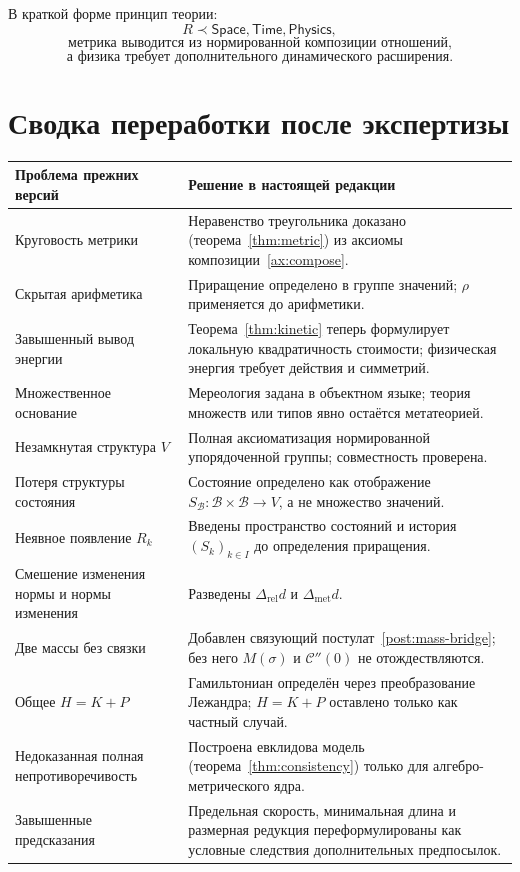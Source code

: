 \documentclass[12pt,a4paper,oneside]{book}
\theoremstyle{definition}
\theoremstyle{plain}
\theoremstyle{remark}
\newcommand{\SubParts}{\mathcal B}
\newcommand{\Rel}{R}
\newcommand{\Values}{V}
\newcommand{\State}{S}
\newcommand{\norm}{\rho}
\newcommand{\Space}{\mathsf{Space}}
\newcommand{\Time}{\mathsf{Time}}
\newcommand{\Physics}{\mathsf{Physics}}
\newcommand{\Stab}{\sigma}
\newcommand{\Cost}{\mathcal C}
\begin{document}
В краткой форме принцип теории:
\[
\boxed{\Rel\prec\Space,\Time,\Physics,}
\]
\[
\boxed{\text{метрика выводится из нормированной композиции отношений,}}
\]
\[
\boxed{\text{а физика требует дополнительного динамического расширения.}}
\]

\backmatter

\chapter*{Сводка переработки после экспертизы}

\begin{center}
\small
\renewcommand{\arraystretch}{1.15}
\begin{tabular}{>{\raggedright\arraybackslash}p{}>{\raggedright\arraybackslash}p{}}
\toprule
\textbf{Проблема прежних версий} & \textbf{Решение в настоящей редакции} \\
\midrule
Круговость метрики & Неравенство треугольника доказано (теорема~\ref{thm:metric}) из
аксиомы композиции~\ref{ax:compose}. \\
Скрытая арифметика & Приращение определено в группе значений; $\norm$ применяется до
арифметики. \\
Завышенный вывод энергии & Теорема~\ref{thm:kinetic} теперь формулирует локальную
квадратичность стоимости; физическая энергия требует действия и симметрий. \\
Множественное основание & Мереология задана в объектном языке; теория множеств или
типов явно остаётся метатеорией. \\
Незамкнутая структура $\Values$ & Полная аксиоматизация нормированной упорядоченной
группы; совместность проверена. \\
Потеря структуры состояния & Состояние определено как отображение
$\State_{\SubParts}:\SubParts\times\SubParts\to\Values$, а не множество значений. \\
Неявное появление $R_k$ & Введены пространство состояний и история
$(\State_k)_{k\in I}$ до определения приращения. \\
Смешение изменения нормы и нормы изменения & Разведены
$\Delta_{\mathrm{rel}}d$ и $\Delta_{\mathrm{met}}d$. \\
Две массы без связки & Добавлен связующий постулат~\ref{post:mass-bridge}; без него
$M(\Stab)$ и $\Cost''(0)$ не отождествляются. \\
Общее $H=K+P$ & Гамильтониан определён через преобразование Лежандра; $H=K+P$ оставлено
только как частный случай. \\
Недоказанная полная непротиворечивость & Построена евклидова модель
(теорема~\ref{thm:consistency}) только для алгебро-метрического ядра. \\
Завышенные предсказания & Предельная скорость, минимальная длина и размерная редукция
переформулированы как условные следствия дополнительных предпосылок. \\
\bottomrule
\end{tabular}
\end{center}
\end{document}
